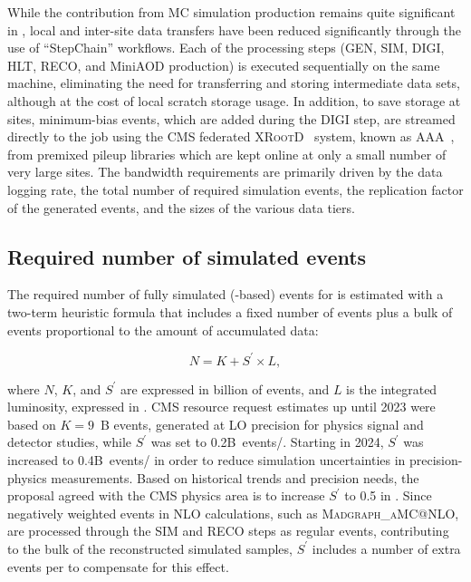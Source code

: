 While the contribution from \gls{MC} simulation production remains quite significant in \RunThree, local and inter-site data transfers have been reduced significantly through the use of ``StepChain'' workflows. Each of the processing steps (\gls{GEN}, \gls{SIM}, \gls{DIGI}, \gls{HLT}, \gls{RECO}, and MiniAOD production) is executed sequentially on the same machine, eliminating the need for transferring and storing intermediate data sets, although at the cost of local scratch storage usage. In addition, to save storage at sites, minimum-bias events, which are added during the \gls{DIGI} step, are streamed directly to the job using the CMS federated \textsc{XRootD}~\cite{CMS:2014cof} system, known as \gls{AAA}~\cite{Bloom:2015poa}, from premixed pileup libraries which are kept online at only a small number of very large sites. The bandwidth requirements are primarily driven by the data logging rate, the total number of required simulation events, the replication factor of the generated events, and the sizes of the various data tiers.

\subsection{Required number of simulated events}
\label{sec:rnse}

The required number of fully simulated (\GEANTfour-based) events for \RunThree is estimated with a two-term heuristic formula that includes a fixed number of events plus a bulk of events proportional to the amount of accumulated data: 

\begin{equation}\label{eq:phase1nroMC}
        N = K + S^{\prime} \times L,
\end{equation}

where $N$, $K$, and $S^{\prime}$ are expressed in billion of events, and $L$ is the integrated luminosity, expressed in \fbinv. CMS resource request estimates up until 2023 were based on $K=9$~B events, generated at \gls{LO} precision for physics signal and detector studies, while $S^{\prime}$ was set to 0.2\unit{B events/\fbinv}. Starting in 2024, $S^{\prime}$ was increased to 0.4\unit{B events/\fbinv} in order to reduce \RunThree simulation uncertainties in precision-physics measurements. Based on historical trends and precision needs, the proposal agreed with the CMS physics area is to increase $S^{\prime}$ to 0.5 in \PhaseTwo. 
Since negatively weighted events in \gls{NLO} calculations, such as \textsc{Madgraph\_aMC@NLO}, are processed through the \gls{SIM} and \gls{RECO} steps as regular events, contributing to the bulk of the reconstructed simulated samples, $S^{\prime}$ includes a number of extra events per \fbinv to compensate for this effect.


